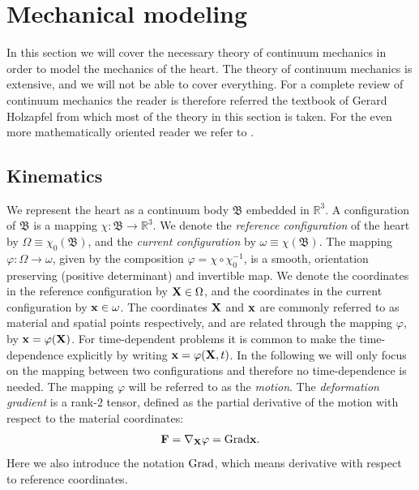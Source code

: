 \section{Mechanical modeling}
\label{sec:intro_mechanical}

In this section we will cover the necessary theory of continuum
mechanics in order to model the mechanics of the heart. The theory of
continuum mechanics is extensive, and we will not be able to cover
everything. For a complete review of continuum mechanics the reader is
therefore referred the textbook of Gerard Holzapfel
\cite{holzapfel2000nonlinear} from which most of the theory in this
section is taken. For the even more mathematically oriented reader we
refer to \cite{marsden1994mathematical}.

\subsection{Kinematics}
We represent the heart as a continuum body $\mathfrak{B}$ embedded in
$\mathbb{R}^3$. A configuration of $\mathfrak{B}$ is a mapping $\chi:
\mathfrak{B} \rightarrow \mathbb{R}^3$. 
We denote the \emph{reference configuration} of the heart by $\Omega
\equiv \chi_0(\mathfrak{B})$, and the \emph{current configuration} by $\omega
\equiv \chi(\mathfrak{B})$. The mapping $\varphi :  \Omega
\rightarrow \omega$, given by the composition $\varphi = \chi
\circ \chi_0^{-1}$, is a smooth, orientation preserving (positive
determinant) and invertible map. We denote the coordinates in the
reference configuration by $\mathbf{X} \in \Omega$, and the coordinates in the current
configuration by $\mathbf{x} \in \omega$. The coordinates $\mathbf{X}$ and $\mathbf{x}$ are
commonly referred to as material and spatial points respectively, and
are related through the mapping $\varphi$, by $\mathbf{x} = \varphi(\mathbf{X})$.
For time-dependent problems it is common to make  the time-dependence
explicitly by writing $\mathbf{x} = \varphi(\mathbf{X}, t)$. In the following
we will only focus on the mapping between two configurations and
therefore no time-dependence is needed. The mapping $\varphi$ will be
referred to as the \emph{motion}. The \emph{deformation gradient} is a
rank-2 tensor, defined as the partial derivative of the motion with
respect to the material coordinates:
\begin{align}
  \mathbf{F} = \nabla_{\mathbf{X}} \varphi= \mathrm{Grad} \mathbf{x}.
  \label{eq:deformation_gradient}
\end{align}
Here we also introduce the notation $\mathrm{Grad}$, which means derivative
with respect to reference coordinates.
